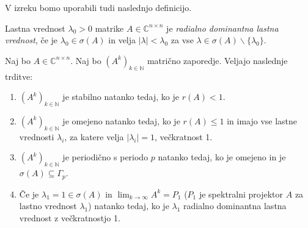 \documentclass[mat1]{fmfdelo}
\newcommand{\N}{\mathbb N}
\newcommand{\C}{\mathbb C}
\begin{document}
V izreku bomo uporabili tudi naslednjo definicijo.
\begin{definicija}
    Lastna vrednost $\lambda_0 > 0$ matrike $A \in \C^{n \times n}$ je \emph{radialno dominantna lastna vrednost}, če je $\lambda_0 \in \sigma(A)$ in velja $|\lambda| < \lambda_0$ za vse $\lambda \in \sigma(A) \backslash \{\lambda_0\}$.
\end{definicija}
\begin{izrek}
    Naj bo $A \in \C^{n \times n}$. Naj bo $(A^k)_{k\in\N}$ matrično zaporedje. Veljajo naslednje trditve:
    \begin{enumerate}
        \item $(A^k)_{k\in\N}$ je stabilno natanko tedaj, ko je $r(A) < 1$.
        \item $(A^k)_{k\in\N}$ je omejeno natanko tedaj, ko je $r(A) \leq 1$ in imajo vse lastne vrednosti $\lambda_i$, za katere velja $|\lambda_i| = 1$, večkratnost 1.
        \item $(A^k)_{k\in\N}$ je periodično s periodo $p$ natanko tedaj, ko je omejeno in je $\sigma(A) \subseteq \Gamma_p$.
        \item Če je $\lambda_1 = 1 \in \sigma(A)$ in $\lim_{k\rightarrow\infty} A^k = P_1$ ($P_1$ je spektralni projektor $A$ za lastno vrednost $\lambda_1$) natanko tedaj, ko je $\lambda_1$ radialno dominantna lastna vrednost z večkratnostjo 1.
    \end{enumerate}
\end{izrek}
\end{document}
